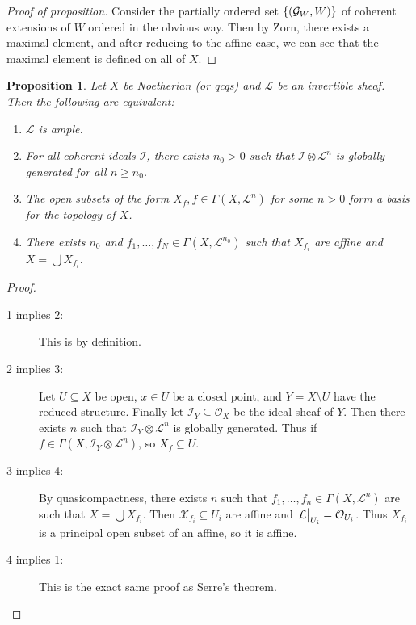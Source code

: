 \documentclass[leqno, openany]{memoir}
\newtheorem{prop}[thm]{Proposition}
\theoremstyle{definition}
\theoremstyle{remark}
\theoremstyle{plain}
\theoremstyle{definition}
\theoremstyle{remark}
\newcommand{\mc}[1]{\mathcal{#1}}
\begin{document}
\begin{proof}[Proof of proposition]
    Consider the partially ordered set $\qty{ (\mc{G}_W,W) }$ of coherent extensions of $W$ ordered in the obvious way. Then by Zorn, there exists a maximal element, and after reducing to the affine case, we can see that the maximal element is defined on all of $X$.
\end{proof}

\begin{prop}
    Let $X$ be Noetherian (or qcqs) and $\mc{L}$ be an invertible sheaf. Then the following are equivalent:
    \begin{enumerate}
        \item $\mc{L}$ is ample.
        \item For all coherent ideals $\mc{I}$, there exists $n_0 > 0$ such that $\mc{I} \otimes \mc{L}^n$ is globally generated for all $n \geq n_0$.
        \item The open subsets of the form $X_f, f \in \Gamma(X, \mc{L}^n)$ for some $n > 0$ form a basis for the topology of $X$.
        \item There exists $n_0$ and $f_1, \ldots, f_N \in \Gamma(X, \mc{L}^{n_0})$ such that $X_{f_i}$ are affine and $X = \bigcup X_{f_i}$.
    \end{enumerate}
\end{prop}

\begin{proof}\leavevmode
    \begin{description}
        \item[1 implies 2:] This is by definition.
        \item[2 implies 3:] Let $U \subseteq X$ be open, $x \in U$ be a closed point, and $Y = X \setminus U$ have the reduced structure. Finally let $\mc{I}_Y \subseteq \mc{O}_X$ be the ideal sheaf of $Y$. Then there exists $n$ such that $\mc{I}_Y \otimes \mc{L}^n$ is globally generated. Thus if $f \in \Gamma(X, \mc{I}_Y \otimes \mc{L}^n)$, so $X_f \subseteq U$.
        \item[3 implies 4:] By quasicompactness, there exists $n$ such that $f_1, \ldots, f_n \in \Gamma(X, \mc{L}^n)$ are such that $X = \bigcup X_{f_i}$. Then $\mc{X}_{f_i} \subseteq U_i$ are affine and $\eval{\mc{L}}_{U_i} = \mc{O}_{U_i}$. Thus $X_{f_i}$ is a principal open subset of an affine, so it is affine.
        \item[4 implies 1:] This is the exact same proof as Serre's theorem. \qedhere
    \end{description}
\end{proof}
\end{document}
